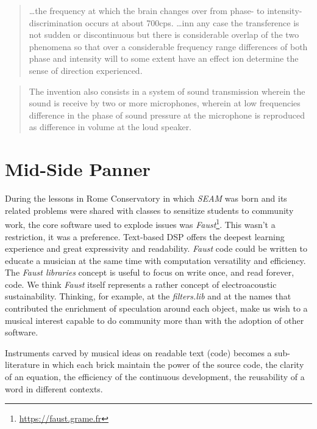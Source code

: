 \documentclass{article}
\begin{document}
\begin{quotation}
…the frequency at which the brain changes over from phase- to
intensity-discrimination occurs at about 700cps. …inn any case the transference
is not sudden or discontinuous but there is considerable overlap of the two
phenomena so that over a considerable frequency range differences of both phase
and intensity will to some extent have an effect ion determine the sense of
direction experienced.
\end{quotation}

\begin{quotation}
The invention also consists in a system of sound transmission wherein the sound
is receive by two or more microphones, wherein at low frequencies difference in
the phase of sound pressure at the microphone is reproduced as difference in
volume at the loud speaker.
\end{quotation}

\vfill\null

\newpage

\section{Mid-Side Panner}
\label{sec:mspanner}

During the lessons in Rome Conservatory in which \emph{SEAM} was born and its
related problems were shared with classes to sensitize students to community
work, the core software used to explode issues was \emph{Faust}\footnote{
\url{https://faust.grame.fr}}. This wasn't a restriction, it was a preference.
Text-based DSP offers the deepest learning experience and great expressivity
and readability. \emph{Faust} code could be written to educate a musician at
the same time with computation versatility and efficiency. The \emph{Faust
libraries} concept is useful to focus on write once, and read forever, code.
We think \emph{Faust} itself represents a rather concept of electroacoustic
sustainability. Thinking, for example, at the \emph{filters.lib} and at the
names that contributed the enrichment of speculation around each object, make
us wish to a musical interest capable to do community more than with the
adoption of other software.

Instruments carved by musical ideas on readable text (code) becomes a
sub-literature in which each brick maintain the power of the source code, the
clarity of an equation, the efficiency of the continuous development, the
reusability of a word in different contexts.
\end{document}
